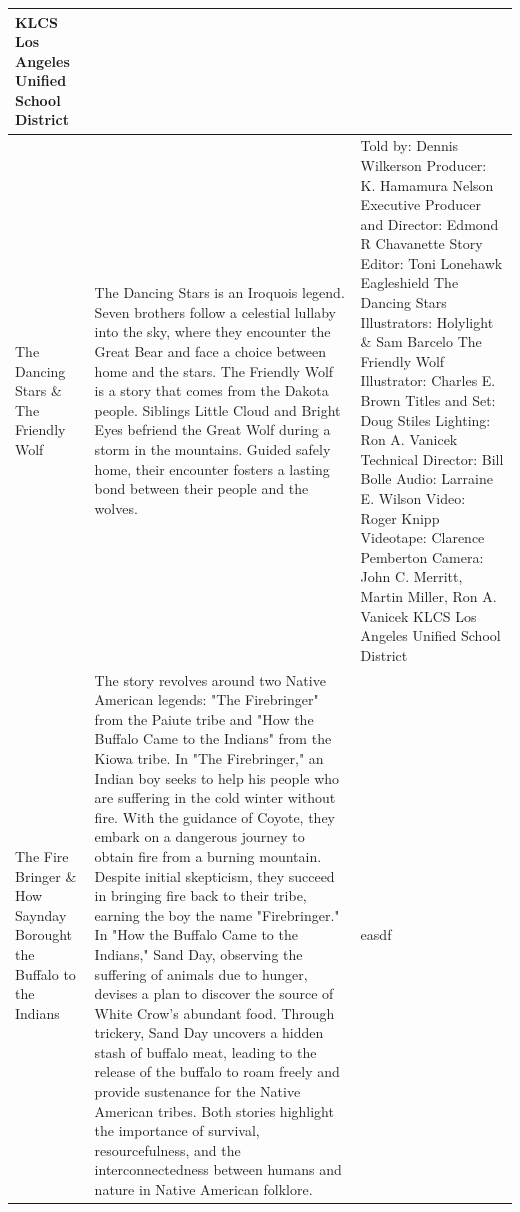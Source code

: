 \begin{table}[h]
\begin{small}
\begin{tabular}{|p{1.5cm}|p{7cm}|p{7cm}|}
            KLCS Los Angeles Unified School District
            \\
            \hline
            The Dancing Stars \& The Friendly Wolf
                                 &
            The Dancing Stars is an Iroquois legend.
            Seven brothers follow a celestial lullaby into the sky, where they encounter the Great Bear and face a choice between home and the stars.
            The Friendly Wolf is a story that comes from the Dakota people.
            Siblings Little Cloud and Bright Eyes befriend the Great Wolf during a storm in the mountains.
            Guided safely home, their encounter fosters a lasting bond between their people and the wolves.
                                 &
            Told by: Dennis Wilkerson
            Producer: K. Hamamura Nelson
            Executive Producer and Director: Edmond R Chavanette
            Story Editor: Toni Lonehawk Eagleshield
            The Dancing Stars Illustrators: Holylight \& Sam Barcelo
            The Friendly Wolf Illustrator: Charles E. Brown
            Titles and Set: Doug Stiles
            Lighting: Ron A. Vanicek
            Technical Director: Bill Bolle
            Audio: Larraine E. Wilson
            Video: Roger Knipp
            Videotape: Clarence Pemberton
            Camera: John C. Merritt, Martin Miller, Ron A. Vanicek
            KLCS Los Angeles Unified School District
            \\
            \hline
            The Fire Bringer \& How Saynday Borought the Buffalo to the Indians
                                 &
            The story revolves around two Native American legends: "The Firebringer" from the Paiute tribe and "How the Buffalo Came to the Indians" from the Kiowa tribe.
            In "The Firebringer," an Indian boy seeks to help his people who are suffering in the cold winter without fire.
            With the guidance of Coyote, they embark on a dangerous journey to obtain fire from a burning mountain.
            Despite initial skepticism, they succeed in bringing fire back to their tribe, earning the boy the name "Firebringer."
            In "How the Buffalo Came to the Indians," Sand Day, observing the suffering of animals due to hunger, devises a plan to discover the source of White Crow's abundant food.
            Through trickery, Sand Day uncovers a hidden stash of buffalo meat, leading to the release of the buffalo to roam freely and provide sustenance for the Native American tribes.
            Both stories highlight the importance of survival, resourcefulness, and the interconnectedness between humans and nature in Native American folklore.
                                 &
            easdf
            \\
            \hline
        \end{tabular}
    \end{small}

\end{table}